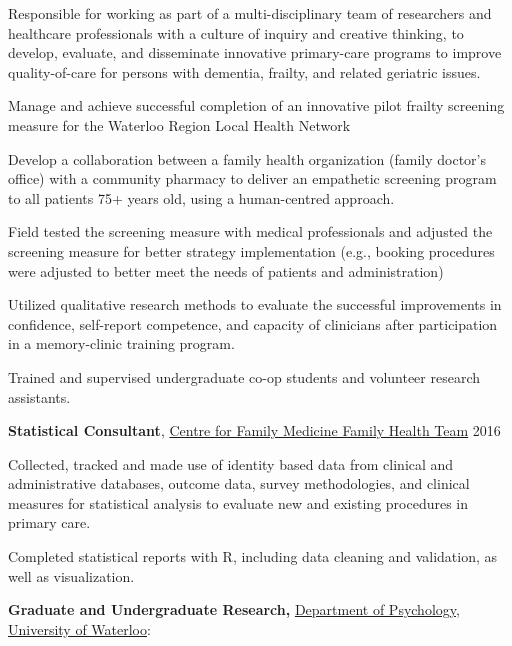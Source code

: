 \documentclass[10pt]{article}
\newenvironment{innerlist}[1][\enskip\textbullet]%
        {\begin{compactenum}[#1]}{\end{compactenum}}
\providecommand{\tightlist}{%
  \setlength{\itemsep}{0pt}\setlength{\parskip}{0pt}}
\begin{document}
\begin{outerlist}
 \begin{innerlist}
  \tightlist
  \item
    Responsible for working as part of a multi-disciplinary team of
    researchers and healthcare professionals with a culture of inquiry
    and creative thinking, to develop, evaluate, and disseminate
    innovative primary-care programs to improve quality-of-care for
    persons with dementia, frailty, and related geriatric issues.
  \item
    Manage and achieve successful completion of an innovative pilot
    frailty screening measure for the Waterloo Region Local Health
    Network
  \item
    Develop a collaboration between a family health organization (family
    doctor's office) with a community pharmacy to deliver an empathetic
    screening program to all patients 75+ years old, using a
    human-centred approach.
  \item
    Field tested the screening measure with medical professionals and
    adjusted the screening measure for better strategy implementation
    (e.g., booking procedures were adjusted to better meet the needs of
    patients and administration)
  \item
    Utilized qualitative research methods to evaluate the successful
    improvements in confidence, self-report competence, and capacity of
    clinicians after participation in a memory-clinic training program.
  \item
    Trained and supervised undergraduate co-op students and volunteer
    research assistants.
 \end{innerlist}
\item
  \textbf{Statistical Consultant},
  \href{https://family-medicine.ca/}{Centre for Family Medicine Family
  Health Team} \hfill 2016

 \begin{innerlist}
  \tightlist
  \item
    Collected, tracked and made use of identity based data from clinical
    and administrative databases, outcome data, survey methodologies,
    and clinical measures for statistical analysis to evaluate new and
    existing procedures in primary care.
  \item
    Completed statistical reports with R, including data cleaning and
    validation, as well as visualization.
 \end{innerlist}
\end{outerlist}

\textbf{Graduate and Undergraduate Research,}
\href{http://psychology.uwaterloo.ca}{Department of Psychology},
\href{http://www.uwaterloo.ca/}{University of Waterloo}:
\end{document}
